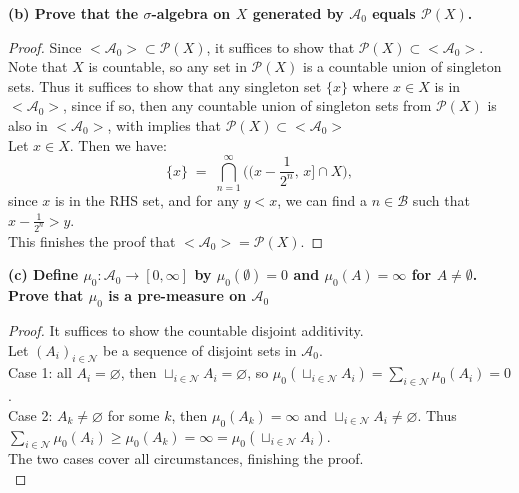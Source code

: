 \documentclass[lang=cn,11pt]{elegantbook}
\begin{document}
\noindent \textbf{(b) Prove that the \(\sigma\)-algebra on \(X\) generated by \(\mathcal{A}_0\) equals \(\mathcal{P}(X)\).}
\begin{proof}
Since $<\mathcal{A}_0> \subset \mathcal{P}(X)$, it suffices to show that $\mathcal{P}(X) \subset <\mathcal{A}_0>$.
\noindent Note that $X$ is countable, so any set in $\mathcal{P}(X)$ is a countable union of singleton sets. Thus it suffices to show that any singleton set $\{x\}$ where $x\in X$ is in $<\mathcal{A}_0>$, since if so, then any countable union of singleton sets from $\mathcal{P}(X)$ is also in $<\mathcal{A}_0>$, with implies that $\mathcal{P}(X) \subset <\mathcal{A}_0>$\\
\noindent Let $x \in X$. Then we have: 
   \[
     \{x\} \;=\; \bigcap_{n=1}^\infty \bigl( (x - \frac{1}{2^{n}},\,x]\cap X \bigr),
   \]
 since $x$ is in the RHS set, and for any $y <x$, we can find a $n \in \mathcal{B}$ such that $x - \frac{1}{2^n} > y$.\\
 \noindent This finishes the proof that  \(<\mathcal{A}_0> = \mathcal{P}(X)\).
\end{proof}


\noindent \textbf{(c) Define \(\mu_0 : \mathcal{A}_0 \to [0, \infty]\) by \(\mu_0(\emptyset) = 0\) and \(\mu_0(A) = \infty\) for \(A \neq \emptyset\). Prove that \(\mu_0\) is a pre-measure on \(\mathcal{A}_0\)}
\begin{proof}
It suffices to show the countable disjoint additivity.\\
Let $(A_i)_{i\in\mathcal{N} }$ be a sequence of disjoint sets in $\mathcal{A}_0$.\\
Case 1: all $A_i = \varnothing$, then $\sqcup_{i\in \mathcal{N} } A_i = \varnothing$, so $\mu_0(\sqcup_{i\in \mathcal{N} } A_i) = \sum_{i\in\mathcal{N} }\mu_0(A_i) = 0$.\\
Case 2: $A_k \not = \varnothing$ for some $k$, then $\mu_0 (A_k) = \infty$ and $\sqcup_{i\in \mathcal{N} } A_i \not= \varnothing$. Thus $\sum_{i\in\mathcal{N} }\mu_0(A_i) \geq \mu_0(A_k)= \infty = \mu_0(\sqcup_{i\in \mathcal{N} } A_i )$.\\
The two cases cover all circumstances, finishing the proof.\\
\end{proof}
\end{document}
